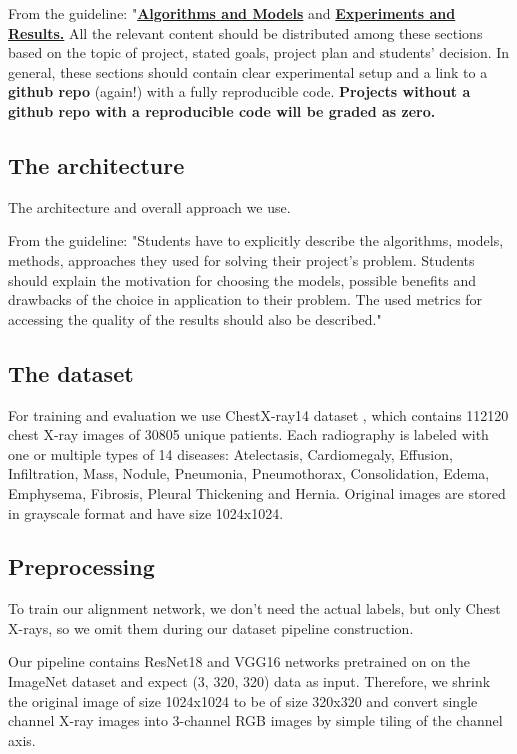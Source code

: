 \documentclass{article}
\begin{document}
From the guideline:
"\underline{\textbf{Algorithms and Models}} and 
\underline{\textbf{Experiments and Results.}} All the relevant content should 
be distributed among these sections based on the topic of project, stated 
goals, project plan and students' decision. In general, these sections should 
contain clear experimental setup and a  link to a \textbf{github repo} (again!) 
with a fully reproducible code. 
\textbf{Projects without a github repo with a reproducible code will be graded as zero.}

\subsection{The architecture}
The architecture and overall approach we use.

From the guideline:
"Students have to explicitly describe the algorithms, models, methods, 
approaches they used for solving their project's problem. Students should 
explain the motivation for choosing the models, possible benefits and drawbacks 
of the choice in application to their problem. The used metrics for accessing 
the quality of the results should also be described."

\subsection{The dataset}
For training and evaluation we use ChestX-ray14 dataset \cite{DataSet}, which 
contains 112120 chest X-ray images of 30805 unique patients. Each radiography 
is labeled with one or multiple types of 14 diseases: Atelectasis, 
Cardiomegaly, Effusion, Infiltration, Mass, Nodule, Pneumonia, Pneumothorax, 
Consolidation, Edema, Emphysema, Fibrosis, Pleural Thickening and Hernia. 
Original images are stored in grayscale format and have size 1024x1024. 

\subsection{Preprocessing}
To train our alignment network, we don't need the actual labels, but only Chest 
X-rays, so we omit them during our dataset pipeline construction.

Our pipeline contains ResNet18 and VGG16 networks pretrained on on the ImageNet 
dataset \cite{ImageNet} and expect (3, 320, 320) data as input. Therefore, we 
shrink the original image of size 1024x1024 to be of size 320x320 and convert 
single channel X-ray images into 3-channel RGB images by simple tiling of the 
channel axis.
\end{document}
